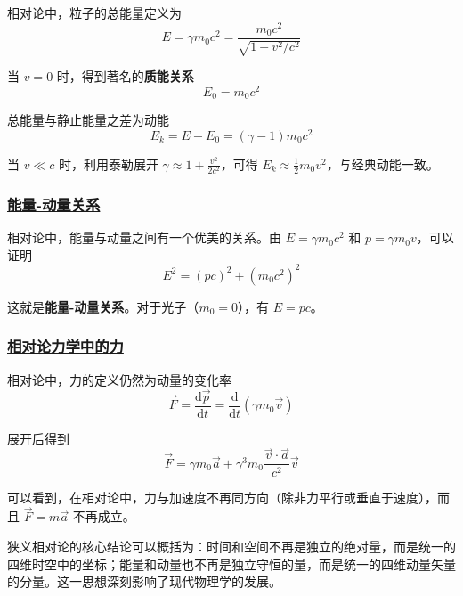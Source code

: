 相对论中，粒子的总能量定义为
\begin{equation}
    E = \gamma m_0 c^2 = \frac{m_0 c^2}{\sqrt{1 - v^2/c^2}}
\end{equation}

当 $v = 0$ 时，得到著名的\textbf{质能关系}
\begin{equation}
    E_0 = m_0 c^2
\end{equation}

总能量与静止能量之差为动能
\begin{equation}
    E_k = E - E_0 = (\gamma - 1)m_0 c^2
\end{equation}

当 $v \ll c$ 时，利用泰勒展开 $\gamma \approx 1 + \frac{v^2}{2c^2}$，可得 $E_k \approx \frac{1}{2}m_0 v^2$，与经典动能一致。

\subsubsection{\protect\hyperlink{:}{能量-动量关系}}

相对论中，能量与动量之间有一个优美的关系。由 $E = \gamma m_0 c^2$ 和 $p = \gamma m_0 v$，可以证明
\begin{equation}
    E^2 = (pc)^2 + (m_0 c^2)^2
\end{equation}

这就是\textbf{能量-动量关系}。对于光子（$m_0 = 0$），有 $E = pc$。

\subsubsection{\protect\hyperlink{:}{相对论力学中的力}}

相对论中，力的定义仍然为动量的变化率
\begin{equation}
    \vec{F} = \frac{\mathrm{d}\vec{p}}{\mathrm{d}t} = \frac{\mathrm{d}}{\mathrm{d}t}(\gamma m_0 \vec{v})
\end{equation}

展开后得到
\begin{equation}
    \vec{F} = \gamma m_0 \vec{a} + \gamma^3 m_0 \frac{\vec{v} \cdot \vec{a}}{c^2}\vec{v}
\end{equation}

可以看到，在相对论中，力与加速度不再同方向（除非力平行或垂直于速度），而且 $\vec{F} = m\vec{a}$ 不再成立。

\begin{remark}
    狭义相对论的核心结论可以概括为：时间和空间不再是独立的绝对量，而是统一的四维时空中的坐标；能量和动量也不再是独立守恒的量，而是统一的四维动量矢量的分量。这一思想深刻影响了现代物理学的发展。
\end{remark}

